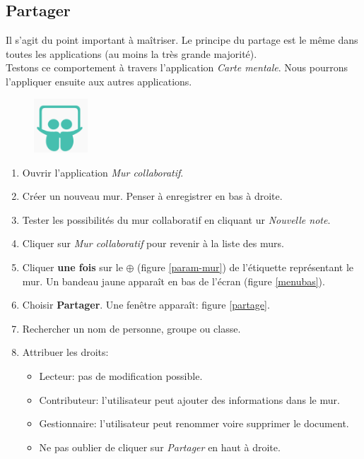 \documentclass[a4paper,11pt]{article}
\begin{document}
\begin{Form}
\subsection{Partager}
Il s'agit du point important à maîtriser. Le principe du partage est le même dans toutes les applications (au moins la très grande majorité).\\
Testons ce comportement à travers l'application \emph{Carte mentale}. Nous pourrons l'appliquer ensuite aux autres applications.
\begin{figure}[!h]
\centering
\includegraphics[width=2cm]{ressources/mur.png}
\label{mur}
\end{figure}
\begin{activite}
\begin{enumerate}
\item Ouvrir l'application \emph{Mur collaboratif}.
\item Créer un nouveau mur. Penser à enregistrer en bas à droite.
\item Tester les possibilités du mur collaboratif en cliquant ur \emph{Nouvelle note}.
\item Cliquer sur \emph{Mur collaboratif} pour revenir à la liste des murs.
\item Cliquer \textbf{une fois} sur le $\oplus$ (figure \ref{param-mur}) de l'étiquette représentant le mur. Un bandeau jaune apparaît en bas de l'écran (figure \ref{menubas}).
\item Choisir \textbf{Partager}. Une fenêtre apparaît: figure \ref{partage}.
\item Rechercher un nom de personne, groupe ou classe.
\item Attribuer les droits:
\begin{itemize}
\item Lecteur: pas de modification possible.
\item Contributeur: l'utilisateur peut ajouter des informations dans le mur.
\item Gestionnaire: l'utilisateur peut renommer voire supprimer le document.
\item Ne pas oublier de cliquer sur \emph{Partager} en haut à droite.
\end{itemize}
\end{enumerate}

\end{activite}
\end{Form}
\end{document}
